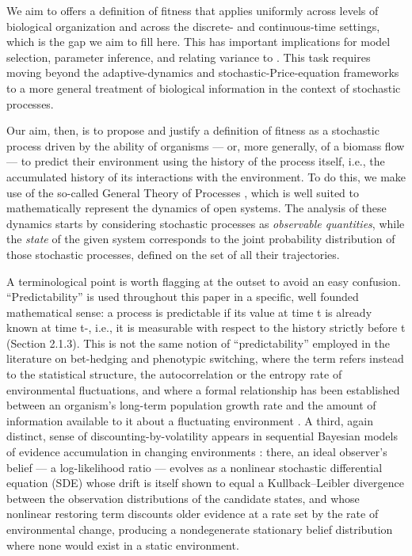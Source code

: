 \documentclass[12pt]{article}
\begin{document}
We aim to offers a definition of fitness that applies uniformly across levels of biological organization and across the discrete- and continuous-time settings, which is the gap we aim to fill here. This has important implications for model selection, parameter inference, and relating variance to \cite{azaele2006dynamical,rottjers2018hairballs,patterson2021and}. This task requires moving beyond the adaptive-dynamics and stochastic-Price-equation frameworks to a more general treatment of biological information in the context of stochastic processes.

Our aim, then, is to propose and justify a definition of fitness as a stochastic process driven by the ability of organisms — or, more generally, of a biomass flow — to predict their environment using the history of the process itself, i.e., the accumulated history of its interactions with the environment. To do this, we make use of the so-called General Theory of Processes \cite{meyer2006guide}, which is well suited to mathematically represent the dynamics of open systems. The analysis of these dynamics starts by considering stochastic processes as \textit{observable quantities}, while the \textit{state} of the given system corresponds to the joint probability distribution of those stochastic processes, defined on the set of all their trajectories. 

A terminological point is worth flagging at the outset to avoid an easy confusion. “Predictability” is used throughout this paper in a specific, well founded mathematical sense: a process is predictable if its value at time t is already known at time t-, i.e., it is measurable with respect to the history strictly before t (Section 2.1.3). This is not the same notion of “predictability” employed in the literature on bet-hedging and phenotypic switching, where the term refers instead to the statistical structure, the autocorrelation or the entropy rate of environmental fluctuations, and where a formal relationship has been established between an organism's long-term population growth rate and the amount of information available to it about a fluctuating environment \cite{donaldson2010fitness, kussell2005phenotypic,rivoire2011value}. A third, again distinct, sense of discounting-by-volatility appears in sequential Bayesian models of evidence accumulation in changing environments \cite{veliz2016stochastic}: there, an ideal observer's belief — a log-likelihood ratio — evolves as a nonlinear stochastic differential equation (SDE) whose drift is itself shown to equal a Kullback–Leibler divergence between the observation distributions of the candidate states, and whose nonlinear restoring term discounts older evidence at a rate set by the rate of environmental change, producing a nondegenerate stationary belief distribution where none would exist in a static environment. 
\end{document}
